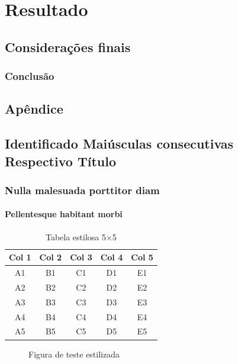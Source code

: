 \documentclass{Arquivos/AcademicoPadrao}
\begin{document}
\part{Resultado} %
\chapter{Considerações finais}
\section{Conclusão}


\postextual %


\printbibliography[heading=none]


\inicioApendices
\chapter{Apêndice}


\inicioAnexos
\chapter{Identificado Maiúsculas consecutivas Respectivo Título}
\section{Nulla malesuada porttitor diam}
\lipsum[3-10]
\subsection{Pellentesque habitant morbi}
\lipsum[8-15]

\begin{table}[ht]
    \centering
    \caption{Tabela estilosa 5×5}
    \label{tab:estilosa}
    \begin{tabular}{ccccc}
        \toprule
        Col 1 & Col 2 & Col 3 & Col 4 & Col 5 \\
        \midrule
        A1 & B1 & C1 & D1 & E1 \\
        A2 & B2 & C2 & D2 & E2 \\
        A3 & B3 & C3 & D3 & E3 \\
        A4 & B4 & C4 & D4 & E4 \\
        A5 & B5 & C5 & D5 & E5 \\
        \bottomrule
    \end{tabular}
\end{table}

\begin{figure}[ht]
    \centering
    \caption{Figura de teste estilizada}
    \label{fig:teste-estilosa}
\end{figure}
\end{document}
